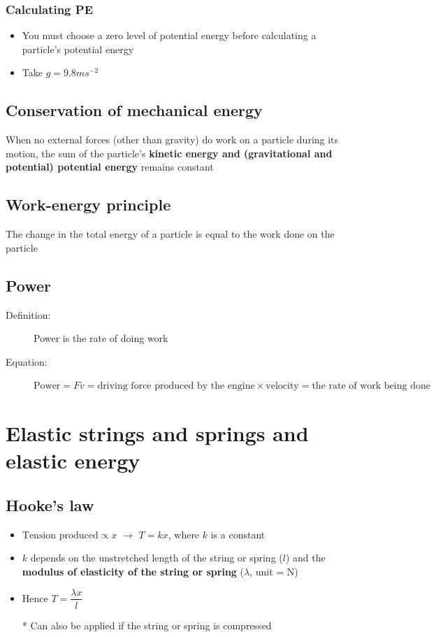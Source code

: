 \documentclass[11pt, A4paper]{article}
\begin{document}
	\subsubsection{Calculating PE}
	\begin{itemize}
		\item You must choose a zero level of potential energy before calculating a particle's potential energy
		\item Take $g=9.8 ms^{-2}$
	\end{itemize}
	
	
	\subsection{Conservation of mechanical energy}
	When no external forces (other than gravity) do work on a particle during its motion, the sum of the particle's \textbf{kinetic energy and (gravitational and potential) potential energy} remains constant
	
	\subsection{Work-energy principle}
	The change in the total energy of a particle is equal to the work done on the particle
	
	\subsection{Power}
	\begin{description}
		\item[Definition:] Power is the rate of doing work
		\item[Equation:] $\text{Power}=Fv=\text{driving force produced by the engine}\times\text{velocity}=\text{the rate of work being done}$
	\end{description}
	
	\section[3 Elastic strings and springs and elastic energy]{Elastic strings and springs and elastic energy}
	\subsection{Hooke's law}
	\begin{itemize}
		\item $\text{Tension produced}\propto x$ $\rightarrow$ $T=kx$, where $k$ is a constant
		\item $k$ depends on the unstretched length of the string or spring ($l$) and the \textbf{modulus of elasticity of the string or spring} ($\lambda$, unit = N)
		\item Hence $T=\dfrac{\lambda x}{l}$
		\item[*] Can also be applied if the string or spring is compressed
	\end{itemize}
	
\end{document}
